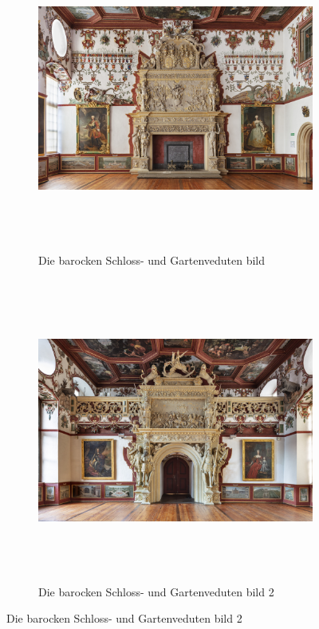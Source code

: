 \documentclass[
  a4paper,
]{book}
\begin{document}
\begin{figure}
\begin{figure}[H]    
  \includegraphics[height=10cm]{images/fmd10005861a.jpg}
  \caption{Die barocken Schloss- und Gartenveduten bild}
  \label{fig:{images/fmd10005861a.jpg}}
\end{figure}

\clearpage

\begin{figure}[H]    
  \includegraphics[height=10cm]{images/fmd10005863a.jpg}
  \caption{Die barocken Schloss- und Gartenveduten bild 2}
  \label{fig:{images/fmd10005863a.jpg}}
\end{figure}

\clearpage


\end{figure}
\end{document}

